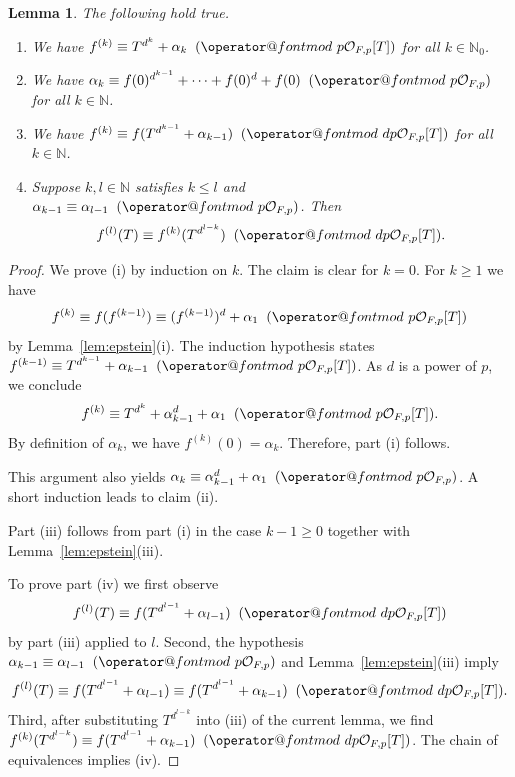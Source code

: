 \documentclass[12pt,oneside,a4]{amsart}
\makeatletter
\newcommand{\IN}{\mathbb{N}}
\newcommand{\cO}{\mathcal{O}}
\newcounter{maincounter}
\numberwithin{maincounter}{section}
\numberwithin{equation}{section}
\newtheorem{lemma}[maincounter]{Lemma}
\def\imod#1{\allowbreak\mkern10mu({\operator@font mod}\,\,#1)}
\makeatother
\begin{document}
\begin{lemma}
  \label{lem:fkcongpsqr}
  The following hold true.
  \begin{enumerate}
  \item [(i)]
    We have $f^{(k)} \equiv T^{d^{k}}+\alpha_k
    \imod{p \cO_{F,p}[T]}$ for all $k\in\IN_0$.
  \item[(ii)] We have $\alpha_k \equiv f(0)^{d^{k-1}}+\cdots +
    f(0)^d + f(0) \imod{p\cO_{F,p}}$ for all $k\in\IN$. 
  \item[(iii)]
    We have $f^{(k)} \equiv f(T^{d^{k-1}}+\alpha_{k-1})
    \imod{dp\cO_{F,p}[T]}$ for all $k\in\IN$.
  \item[(iv)] Suppose $k,l\in \IN$ satisfies $k\le l$
    and $\alpha_{k-1} \equiv
    \alpha_{l-1} \imod{p\cO_{F,p}}$. Then
    $$f^{(l)}(T)\equiv f^{(k)}(T^{d^{l-k}}) \imod{dp \cO_{F,p}[T]}.$$
  \end{enumerate}
\end{lemma}
\begin{proof}
  We prove (i) by induction on $k$. The claim is clear for $k=0$.
  For $k\ge 1$ we have
  \begin{equation*}
    f^{(k)} \equiv f(f^{(k-1)}) \equiv (f^{(k-1)})^d + \alpha_1 \imod {p\cO_{F,p}[T]}
  \end{equation*}
  by Lemma~\ref{lem:epstein}(i). The induction hypothesis states
  $f^{(k-1)}\equiv T^{d^{k-1}} + \alpha_{k-1} \imod {p\cO_{F,p}[T]}$.
  As $d$ is a power of $p$, we conclude 
  \begin{equation*}
    f^{(k)} \equiv  T^{d^k} + \alpha_{k-1}^d + \alpha_1 \imod {p\cO_{F,p}[T]}.
  \end{equation*}
  By definition of $\alpha_k$, we have $f^{(k)}(0)= \alpha_k$. 
  Therefore, part (i) follows.

  This  argument also yields $\alpha_k \equiv \alpha_{k-1}^d + \alpha_1
  \imod{p\cO_{F,p}}$.
  A short induction leads to claim (ii).  

  Part (iii) follows from part (i) in the case $k-1\ge 0$ together with
  Lemma~\ref{lem:epstein}(iii).

  To prove part (iv) we first observe
  \begin{equation*}
    f^{(l)}(T)\equiv f(T^{d^{l-1}}+\alpha_{l-1}) \imod {dp\cO_{F,p}[T]}    
  \end{equation*}
  by part (iii) applied to $l$. Second, the hypothesis $\alpha_{k-1}\equiv
  \alpha_{l-1}\imod{p\cO_{F,p}}$ and   Lemma~\ref{lem:epstein}(iii)
  imply
  \begin{equation*}
    f^{(l)}(T)\equiv
    f(T^{d^{l-1}}+\alpha_{l-1}) \equiv     f(T^{d^{l-1}}+\alpha_{k-1}) \imod {dp\cO_{F,p}[T]}.
  \end{equation*}
  Third,  after substituting $T^{d^{l-k}}$ into
  (iii) of the current lemma, we find
  $f^{(k)}(T^{d^{l-k}}) \equiv
  f(T^{d^{l-1}}+\alpha_{k-1})\imod{dp\cO_{F,p}[T]}$.
  The chain of equivalences implies (iv).
\end{proof}
\end{document}
